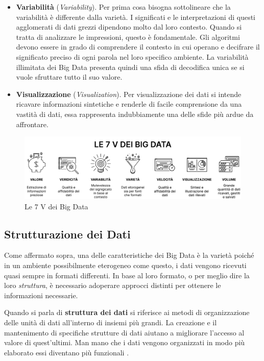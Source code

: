 \begin{itemize}
    \item \textbf{Variabilità} (\textit{Variability}). Per prima cosa bisogna sottolineare che la variabilità è differente dalla varietà. I significati e le interpretazioni di questi agglomerati di dati grezzi dipendono molto dal loro contesto. Quando si tratta di analizzare le impressioni, questo è fondamentale. Gli algoritmi devono essere in grado di comprendere il contesto in cui operano e decifrare il significato preciso di ogni parola nel loro specifico ambiente. La variabilità illimitata dei Big Data presenta quindi una sfida di decodifica unica se si vuole sfruttare tutto il suo valore.
    \item \textbf{Visualizzazione} (\textit{Visualization}). Per visualizzazione dei dati si intende ricavare informazioni sintetiche e renderle di facile comprensione da una vastità di dati, essa rappresenta indubbiamente una delle sfide più ardue da affrontare.
\end{itemize}

\begin{figure}[h!]
    \centering
    \includegraphics[width=1\linewidth]{figure/capitolo_2/Le 7 V dei Big Data.pdf}
    \caption{Le 7 V dei Big Data}
    \label{fig:Le 7 V dei Big Data}
\end{figure}

\subsection{Strutturazione dei Dati}

Come affermato sopra, una delle caratteristiche dei Big Data è la varietà poiché in un ambiente possibilmente eterogeneo come questo, i dati vengono ricevuti quasi sempre in formati differenti. In base al loro formato, o per meglio dire la loro \textit{struttura}, è necessario adoperare approcci distinti per ottenere le informazioni necessarie.

Quando si parla di \textbf{struttura dei dati} si riferisce ai metodi di organizzazione delle unità di dati all'interno di insiemi più grandi. La creazione e il mantenimento di specifiche strutture di dati aiutano a migliorare l'accesso al valore di quest'ultimi. Man mano che i dati vengono organizzati in modo più elaborato essi diventano più funzionali \cite{theastrologypage_data_structure}.

